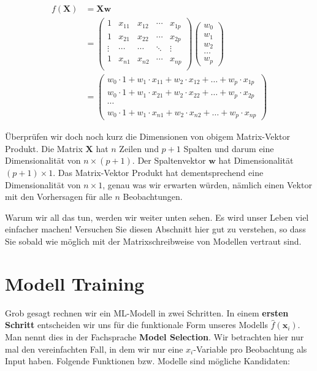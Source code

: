 \documentclass[
]{book}
\begin{document}
\begin{align}
f(\mathbf{X}) &= \mathbf{X}\mathbf{w}\\
&= \begin{pmatrix}
1 & x_{11} & x_{12} & \cdots & x_{1p}\\ 
1 & x_{21} & x_{22} & \cdots & x_{2p}\\
\vdots & \cdots & \cdots & \ddots & \vdots\\
1 & x_{n1} & x_{n2} & \cdots & x_{np}\\
\end{pmatrix}\begin{pmatrix} w_0 \\ w_1 \\ w_2 \\ \dots \\ w_p \end{pmatrix}\\
&= \begin{pmatrix} 
w_0 \cdot 1 + w_1 \cdot x_{11} + w_2 \cdot x_{12} + \dots + w_p \cdot x_{1p} \\
w_0 \cdot 1 + w_1 \cdot x_{21} + w_2 \cdot x_{22} + \dots + w_p \cdot x_{2p} \\ 
\cdots \\ 
w_0 \cdot 1 + w_1 \cdot x_{n1} + w_2 \cdot x_{n2} + \dots + w_p \cdot x_{np}\end{pmatrix}
\end{align}

Überprüfen wir doch noch kurz die Dimensionen von obigem Matrix-Vektor Produkt. Die Matrix \(\mathbf{X}\) hat \(n\) Zeilen und \(p+1\) Spalten und darum eine Dimensionalität von \(n \times (p+1)\). Der Spaltenvektor \(\mathbf{w}\) hat Dimensionalität \((p+1) \times 1\). Das Matrix-Vektor Produkt hat dementsprechend eine Dimensionalität von \(n \times 1\), genau was wir erwarten würden, nämlich einen Vektor mit den Vorhersagen für alle \(n\) Beobachtungen.

Warum wir all das tun, werden wir weiter unten sehen. Es wird unser Leben viel einfacher machen! Versuchen Sie diesen Abschnitt hier gut zu verstehen, so dass Sie sobald wie möglich mit der Matrixschreibweise von Modellen vertraut sind.

\hypertarget{modell-training}{%
\section{Modell Training}\label{modell-training}}

Grob gesagt rechnen wir ein ML-Modell in zwei Schritten. In einem \textbf{ersten Schritt} entscheiden wir uns für die funktionale Form unseres Modells \(\hat{f}(\mathbf{x}_i)\). Man nennt dies in der Fachsprache \textbf{Model Selection}. Wir betrachten hier nur mal den vereinfachten Fall, in dem wir nur eine \(x_i\)-Variable pro Beobachtung als Input haben. Folgende Funktionen bzw. Modelle sind mögliche Kandidaten:
\end{document}
